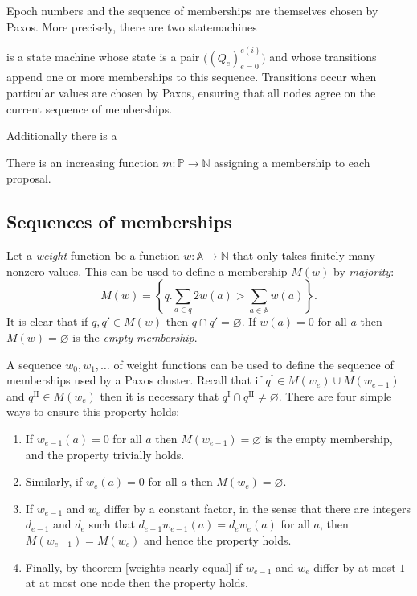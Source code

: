\documentclass[journal]{IEEEtran}
\begin{document}
Epoch numbers and the sequence of memberships are
themselves chosen by Paxos. More precisely, there are two
statemachines

is a state
machine whose state is a pair $\big((Q_e)_{e=0}^{e(i)}\big)$
and whose transitions append one or more memberships to this sequence.
Transitions occur when particular values are chosen by Paxos, ensuring that all
nodes agree on the current sequence of memberships.

Additionally there is a %

There is an increasing function $m : \mathbb P \to \mathbb N$ assigning a
membership to each proposal.

\subsection{Sequences of memberships}

Let a \textit{weight} function be a function $w : \mathbb A \to \mathbb N$ that
only takes finitely many nonzero values. This can be used to define a
membership $M(w)$ by \textit{majority}: \[M(w) = \left\{ q. \sum_{a \in q} 2
w(a) > \sum_{a \in \mathbb A} w(a) \right\}.\] It is clear that if $q, q' \in
M(w)$ then $q \cap q' = \varnothing$. If $w(a) = 0$ for all $a$ then $M(w) =
\varnothing$ is the \textit{empty membership}.

A sequence $w_0, w_1, \ldots$ of weight functions can be used to define the
sequence of memberships used by a Paxos cluster. Recall that if $q^\textrm{I}
\in M(w_e) \cup M(w_{e-1})$ and $q^\textrm{II} \in M(w_e)$ then it is necessary
that $q^\textrm{I} \cap q^\textrm{II} \ne \varnothing$. There are four simple
ways to ensure this property holds:

\begin{enumerate}

\item If $w_{e-1}(a) = 0$ for all $a$ then $M(w_{e-1}) = \varnothing$ is the
empty membership, and the property trivially holds.

\item Similarly, if $w_e(a) = 0$ for all $a$ then $M(w_e) = \varnothing$.

\item If $w_{e-1}$ and $w_e$ differ by a constant factor, in the sense that
there are integers $d_{e-1}$ and $d_e$ such that $d_{e-1} w_{e-1}(a) = d_e
w_e(a)$ for all $a$, then $M(w_{e-1}) = M(w_e)$ and hence the property holds.

\item Finally, by theorem \ref{weights-nearly-equal} if $w_{e-1}$ and $w_e$
differ by at most $1$ at at most one node then the property holds.

\end{enumerate}
\end{document}
